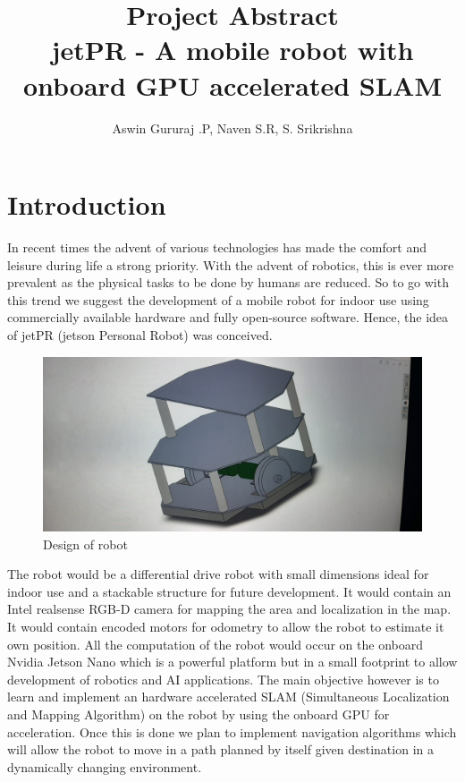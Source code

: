 \documentclass{article}
\title{\textbf{Project Abstract} \\ jetPR - A mobile robot with onboard GPU accelerated SLAM}
\author{Aswin Gururaj .P, Naven S.R, S. Srikrishna }
\date{}
\begin{document}
\maketitle

\section{Introduction}
In recent times the advent of various technologies has made the comfort and leisure during life a strong priority. With the advent of robotics, this is ever more prevalent as the physical tasks to be done by humans are reduced. So to go with this trend we suggest the development of a mobile robot for indoor use using commercially available hardware and fully open-source software. Hence, the idea of jetPR (jetson Personal Robot) was conceived.

\begin{figure}[h!]
\centering
\includegraphics[scale=0.17]{robotdesign.jpeg}
\caption{Design of robot}
\label{fig:universe}
\end{figure}

The robot would be a differential drive robot with small dimensions ideal for indoor use and a stackable structure for future development. It would contain an Intel realsense RGB-D camera for mapping the area and localization in the map. It would contain encoded motors for odometry to allow the robot to estimate it own position. All the computation of the robot would occur on the onboard Nvidia Jetson Nano which is a powerful platform but in a small footprint to allow development of robotics and AI applications. The main objective however is to learn and implement an hardware accelerated SLAM (Simultaneous Localization and Mapping Algorithm) on the robot by using the onboard GPU for acceleration. Once this is done we plan to implement navigation algorithms which will allow the robot to move in a path planned by itself given destination in a dynamically changing environment.
\end{document}
